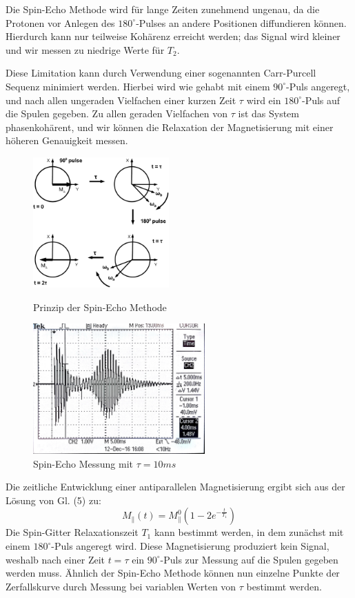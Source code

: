 \documentclass[a4paper]{scrartcl} %
\begin{document}
 
Die Spin-Echo Methode wird für lange Zeiten zunehmend ungenau, da die Protonen vor Anlegen des $180^\circ$-Pulses an andere Positionen diffundieren können. Hierdurch kann nur teilweise Kohärenz erreicht werden; das Signal wird kleiner und wir messen zu niedrige Werte für $T_2$.

Diese Limitation kann durch Verwendung einer sogenannten Carr-Purcell Sequenz minimiert werden. Hierbei wird wie gehabt mit einem $90^\circ$-Puls angeregt, und nach allen ungeraden Vielfachen einer kurzen Zeit $\tau$ wird ein $180^\circ$-Puls auf die Spulen gegeben. Zu allen geraden Vielfachen von $\tau$ ist das System phasenkohärent, und wir können die Relaxation der Magnetisierung mit einer höheren Genauigkeit messen.

\begin{figure}[!htb]
	\centering
	\parbox{70mm}{
		\centering
		\includegraphics[height=50mm]{./Resources/spin_ech_schematic.png}
		\caption{Prinzip der Spin-Echo Methode \autocite{skript}}
		\label{fig:spinecho_bloch}
	}
	\hspace*{\fill}
	\parbox{70mm}{
		\centering
		\includegraphics[height=50mm]{./Resources/spinecho_osci.jpg}
		\caption{Spin-Echo Messung mit $\tau=10ms$}
		\label{fig:spinecho_osci}
	}
\end{figure}

Die zeitliche Entwicklung einer antiparallelen Magnetisierung ergibt sich aus der Lösung von Gl. (5) zu:
\begin{equation}
M_{\parallel}(t) = M_{\parallel}^0(1-2e^{-\frac{t}{T_1}})
\end{equation}
Die Spin-Gitter Relaxationszeit $T_1$ kann bestimmt werden, in dem zunächst mit einem $180^\circ$-Puls angeregt wird. Diese Magnetisierung produziert kein Signal, weshalb nach einer Zeit $t=\tau$ ein $90^\circ$-Puls zur Messung auf die Spulen gegeben werden muss. Ähnlich der Spin-Echo Methode können nun einzelne Punkte der Zerfallskurve durch Messung bei variablen Werten von $\tau$ bestimmt werden.
\end{document}
